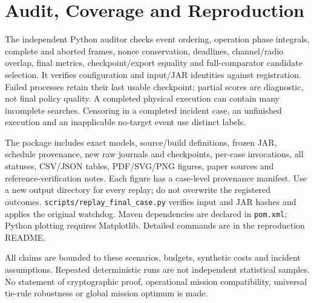 \documentclass[11pt]{article}
\begin{document}
\section{Audit, Coverage and Reproduction}
The independent Python auditor checks event ordering, operation phase integrals, complete
and aborted frames, nonce conservation, deadlines, channel/radio overlap, final metrics,
checkpoint/export equality and full-comparator candidate selection. It verifies configuration
and input/JAR identities against registration. Failed processes retain their last usable
checkpoint; partial scores are diagnostic, not final policy quality. A completed physical
execution can contain many incomplete searches. Censoring in a completed incident case,
an unfinished execution and an inapplicable no-target event use distinct labels.



The package includes exact models, source/build definitions, frozen JAR, schedule provenance,
new raw journals and checkpoints, per-case invocations, all statuses, CSV/JSON tables,
PDF/SVG/PNG figures, paper sources and reference-verification notes. Each figure has a
case-level provenance manifest. Use a new output directory for every replay; do not overwrite
the registered outcomes. \texttt{scripts/replay\_final\_case.py} verifies input and JAR hashes
and applies the original watchdog. Maven dependencies are declared in \texttt{pom.xml};
Python plotting requires Matplotlib. Detailed commands are in the reproduction README.

All claims are bounded to these scenarios, budgets, synthetic costs and incident assumptions.
Repeated deterministic runs are not independent statistical samples. No statement of
cryptographic proof, operational mission compatibility, universal tie-rule robustness or
global mission optimum is made.
\end{document}

